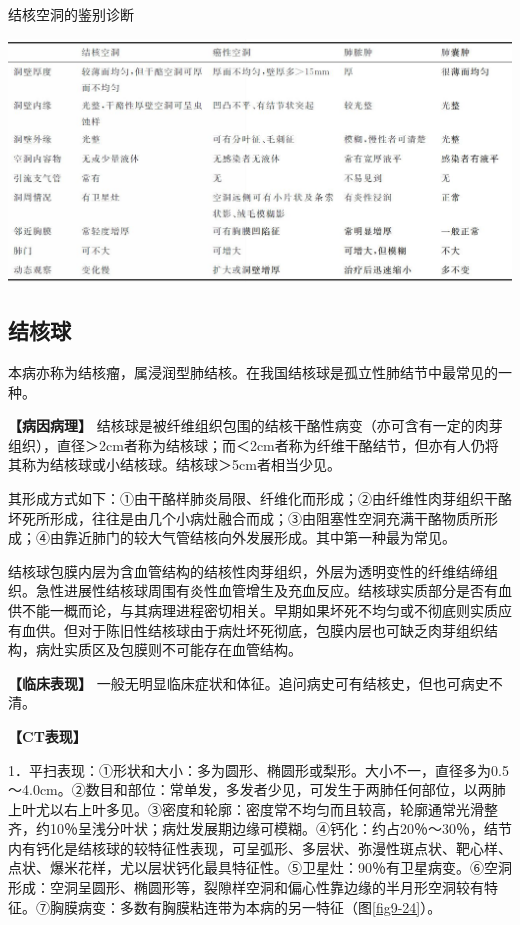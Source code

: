 \begin{table}[htbp]
\centering
\caption{结核空洞的鉴别诊断}
\label{tab9-6}
\includegraphics[width=\textwidth,height=\textheight,keepaspectratio]{./images/Image00211.jpg}
\end{table}

\subsection{结核球}

本病亦称为结核瘤，属浸润型肺结核。在我国结核球是孤立性肺结节中最常见的一种。

\textbf{【病因病理】}
结核球是被纤维组织包围的结核干酪性病变（亦可含有一定的肉芽组织），直径＞2cm者称为结核球；而＜2cm者称为纤维干酪结节，但亦有人仍将其称为结核球或小结核球。结核球＞5cm者相当少见。

其形成方式如下：①由干酪样肺炎局限、纤维化而形成；②由纤维性肉芽组织干酪坏死所形成，往往是由几个小病灶融合而成；③由阻塞性空洞充满干酪物质所形成；④由靠近肺门的较大气管结核向外发展形成。其中第一种最为常见。

结核球包膜内层为含血管结构的结核性肉芽组织，外层为透明变性的纤维结缔组织。急性进展性结核球周围有炎性血管增生及充血反应。结核球实质部分是否有血供不能一概而论，与其病理进程密切相关。早期如果坏死不均匀或不彻底则实质应有血供。但对于陈旧性结核球由于病灶坏死彻底，包膜内层也可缺乏肉芽组织结构，病灶实质区及包膜则不可能存在血管结构。

\textbf{【临床表现】}
一般无明显临床症状和体征。追问病史可有结核史，但也可病史不清。

\textbf{【CT表现】}

1．平扫表现：①形状和大小：多为圆形、椭圆形或梨形。大小不一，直径多为0.5～4.0cm。②数目和部位：常单发，多发者少见，可发生于两肺任何部位，以两肺上叶尤以右上叶多见。③密度和轮廓：密度常不均匀而且较高，轮廓通常光滑整齐，约10％呈浅分叶状；病灶发展期边缘可模糊。④钙化：约占20％～30％，结节内有钙化是结核球的较特征性表现，可呈弧形、多层状、弥漫性斑点状、靶心样、点状、爆米花样，尤以层状钙化最具特征性。⑤卫星灶：90％有卫星病变。⑥空洞形成：空洞呈圆形、椭圆形等，裂隙样空洞和偏心性靠边缘的半月形空洞较有特征。⑦胸膜病变：多数有胸膜粘连带为本病的另一特征（图\ref{fig9-24}）。

